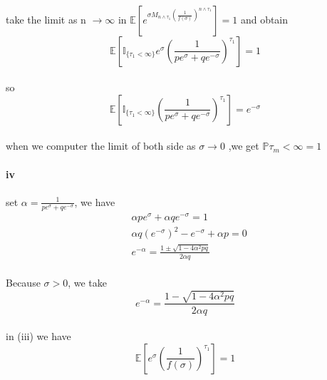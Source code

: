 \documentclass{article}
\begin{document}
\paragraph{}{take the limit as n $\to \infty $ in $\mathbb {E}[e^{\sigma M_{n\land \tau_{1}}(\frac{1}{f(\sigma)})^{n\land \tau_{1}}}]=1$ and obtain
\begin{displaymath}
  \mathbb{E}[\mathbb{I}_{\{ \tau_{1}<\infty\}}e^{\sigma}(\frac{1}{pe^{\sigma}+qe^{-\sigma}})^{\tau_{1}}]=1
\end{displaymath}}
\paragraph{}{so \begin{displaymath}
                  \mathbb{E}[\mathbb{I}_{\{ \tau_{1}<\infty\}}(\frac{1}{pe^{\sigma}+qe^{-\sigma}})^{\tau_{1}}]=e^{-\sigma}
                \end{displaymath}}
\paragraph{}{when we computer the limit of both side as $\sigma \to 0$ ,we get $\mathbb{P}{\tau_{m}<\infty}=1$}
\paragraph{iv}{}
\paragraph{}{set $\alpha = \frac{1}{pe^{\sigma}+qe^{-\sigma}}$, we have}
\begin{align*}
  &\alpha pe^{\sigma}+\alpha q e^{-\sigma}=1\\
  &\alpha q (e^{-\sigma})^2-e^{-\sigma}+\alpha p=0\\
  &e^{-\alpha}=\frac{1\pm \sqrt{1-4\alpha^{2}pq}}{2\alpha q}
\end{align*}
\paragraph{}{Because $\sigma >0$, we take \begin{displaymath}
                                            e^{-\alpha}=\frac{1- \sqrt{1-4\alpha^{2}pq}}{2\alpha q}
                                          \end{displaymath}}
\paragraph{}{in (iii) we have \begin{displaymath}
                                \mathbb{E}[e^{\sigma}(\frac{1}{f(\sigma)})^{\tau_{1}}]=1
                              \end{displaymath}}
\end{document}
